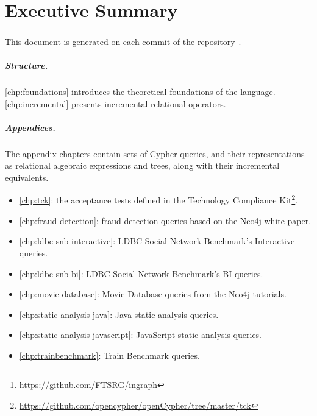 \chapter*{Executive Summary}
\label{chp:executive-summary}

This document is generated on each commit of the \ingraph repository\footnote{\url{https://github.com/FTSRG/ingraph}}.

\paragraph{Structure.} \autoref{chp:foundations} introduces the theoretical foundations of the \opencypher language. \autoref{chp:incremental} presents incremental relational operators.

\paragraph{Appendices.} The appendix chapters contain sets of Cypher queries, and their representations as relational algebraic expressions and trees, along with their incremental equivalents.

\begin{itemize}
	\item \autoref{chp:tck}: the acceptance tests defined in the \opencypher Technology Compliance Kit\footnote{\url{https://github.com/opencypher/openCypher/tree/master/tck}}.
	\item \autoref{chp:fraud-detection}: fraud detection queries based on the Neo4j white paper.
	\item \autoref{chp:ldbc-snb-interactive}: LDBC Social Network Benchmark's Interactive queries.
  \item \autoref{chp:ldbc-snb-bi}: LDBC Social Network Benchmark's BI queries.
	\item \autoref{chp:movie-database}: Movie Database queries from the Neo4j tutorials.
	\item \autoref{chp:static-analysis-java}: Java static analysis queries.
	\item \autoref{chp:static-analysis-javascript}: JavaScript static analysis queries.
	\item \autoref{chp:trainbenchmark}: Train Benchmark queries.
\end{itemize}
